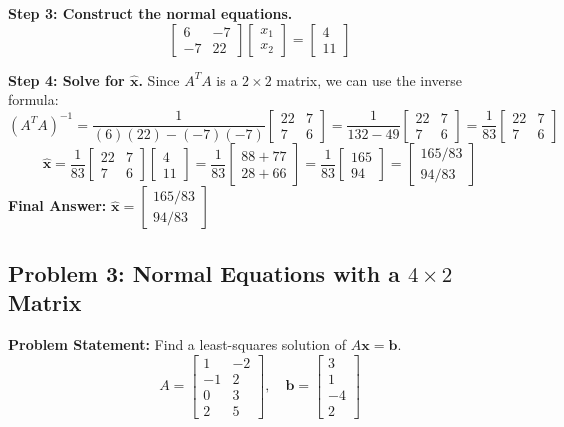 \documentclass[11pt, letterpaper]{article}
\theoremstyle{definition}
\theoremstyle{remark}
\begin{document}
\textbf{Step 3: Construct the normal equations.}
\[
\begin{bmatrix} 6 & -7 \\ -7 & 22 \end{bmatrix} \begin{bmatrix} x_1 \\ x_2 \end{bmatrix} = \begin{bmatrix} 4 \\ 11 \end{bmatrix}
\]

\textbf{Step 4: Solve for $\hat{\mathbf{x}}$.}
Since $A^T A$ is a $2 \times 2$ matrix, we can use the inverse formula:
\[
(A^T A)^{-1} = \frac{1}{(6)(22) - (-7)(-7)} \begin{bmatrix} 22 & 7 \\ 7 & 6 \end{bmatrix} = \frac{1}{132 - 49} \begin{bmatrix} 22 & 7 \\ 7 & 6 \end{bmatrix} = \frac{1}{83} \begin{bmatrix} 22 & 7 \\ 7 & 6 \end{bmatrix}
\]
\[
\hat{\mathbf{x}} = \frac{1}{83} \begin{bmatrix} 22 & 7 \\ 7 & 6 \end{bmatrix} \begin{bmatrix} 4 \\ 11 \end{bmatrix} = \frac{1}{83} \begin{bmatrix} 88 + 77 \\ 28 + 66 \end{bmatrix} = \frac{1}{83} \begin{bmatrix} 165 \\ 94 \end{bmatrix} = \begin{bmatrix} 165/83 \\ 94/83 \end{bmatrix}
\]
\textbf{Final Answer:} $\hat{\mathbf{x}} = \begin{bmatrix} 165/83 \\ 94/83 \end{bmatrix}$

\vspace{1em}
\subsection{Problem 3: Normal Equations with a $4 \times 2$ Matrix}
\textbf{Problem Statement:} Find a least-squares solution of $A\mathbf{x} = \mathbf{b}$.
\[ A = \begin{bmatrix} 1 & -2 \\ -1 & 2 \\ 0 & 3 \\ 2 & 5 \end{bmatrix}, \quad \mathbf{b} = \begin{bmatrix} 3 \\ 1 \\ -4 \\ 2 \end{bmatrix} \]
\end{document}
